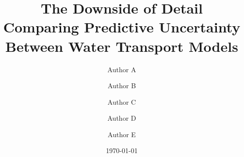 









\title{%
  The Downside of Detail \\
  \large Comparing Predictive Uncertainty\\
  Between Water Transport Models}
    
\author[1,2]{Author A}
\author[1]{Author B}
\author[1]{Author C}
\author[2]{Author D}
\author[2]{Author E}
\setcounter{Maxaffil}{0}
\date{\today}

\maketitle






% 

